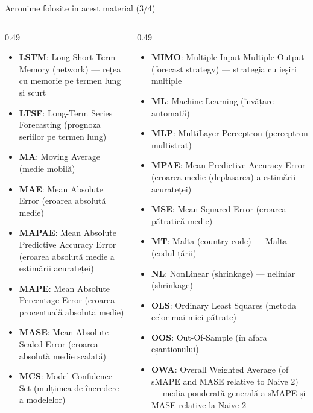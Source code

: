 \begin{frame}{Acronime folosite în acest material (3/4)}
\begin{columns}[T]
\begin{column}{0.49\textwidth}
\begin{itemize}\setlength{\itemsep}{0pt}
    \item \textbf{LSTM}: Long Short-Term Memory (network) — rețea cu memorie pe termen lung și scurt
    \item \textbf{LTSF}: Long-Term Series Forecasting (prognoza seriilor pe termen lung)
    \item \textbf{MA}: Moving Average (medie mobilă)
    \item \textbf{MAE}: Mean Absolute Error (eroarea absolută medie)
    \item \textbf{MAPAE}: Mean Absolute Predictive Accuracy Error (eroarea absolută medie a estimării acurateței)
    \item \textbf{MAPE}: Mean Absolute Percentage Error (eroarea procentuală absolută medie)
    \item \textbf{MASE}: Mean Absolute Scaled Error (eroarea absolută medie scalată)
    \item \textbf{MCS}: Model Confidence Set (mulțimea de încredere a modelelor)
\end{itemize}
\end{column}
\begin{column}{0.49\textwidth}
\begin{itemize}\setlength{\itemsep}{0pt}
    \item \textbf{MIMO}: Multiple-Input Multiple-Output (forecast strategy) — strategia cu ieșiri multiple
    \item \textbf{ML}: Machine Learning (învățare automată)
    \item \textbf{MLP}: MultiLayer Perceptron (perceptron multistrat)
    \item \textbf{MPAE}: Mean Predictive Accuracy Error (eroarea medie (deplasarea) a estimării acurateței)
    \item \textbf{MSE}: Mean Squared Error (eroarea pătratică medie)
    \item \textbf{MT}: Malta (country code) — Malta (codul țării)
    \item \textbf{NL}: NonLinear (shrinkage) — neliniar (shrinkage)
    \item \textbf{OLS}: Ordinary Least Squares (metoda celor mai mici pătrate)
    \item \textbf{OOS}: Out-Of-Sample (în afara eșantionului)
    \item \textbf{OWA}: Overall Weighted Average (of sMAPE and MASE relative to Naive 2) — media ponderată generală a sMAPE și MASE relative la Naive 2
\end{itemize}
\end{column}
\end{columns}
\end{frame}
